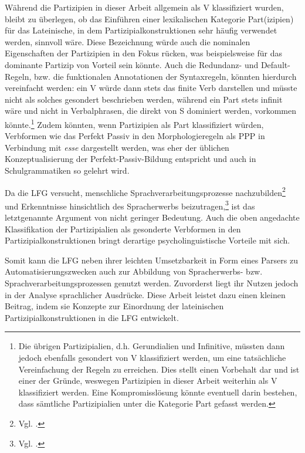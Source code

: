 \documentclass[12pt,a4paper]{article}
\begin{document}
Während die Partizipien in dieser Arbeit allgemein als V klassifiziert wurden, bleibt zu überlegen, ob das Einführen einer lexikalischen Kategorie Part(izipien) für das Lateinische, in dem Partizipialkonstruktionen sehr häufig verwendet werden, sinnvoll wäre. Diese Bezeichnung würde auch die nominalen Eigenschaften der Partizipien in den Fokus rücken, was beispielsweise für das dominante Partizip von Vorteil sein könnte.
Auch die Redundanz- und Default-Regeln, bzw. die funktionalen Annotationen der Syntaxregeln, könnten hierdurch vereinfacht werden: ein V würde dann stets das finite Verb darstellen und müsste nicht als solches gesondert beschrieben werden, während ein Part stets infinit wäre und nicht in Verbalphrasen, die direkt von S dominiert werden, vorkommen könnte.\footnote{Die übrigen Partizipialien, d.h. Gerundialien und Infinitive, müssten dann jedoch ebenfalls gesondert von V klassifiziert werden, um eine tatsächliche Vereinfachung der Regeln zu erreichen. Dies stellt einen Vorbehalt dar und ist einer der Gründe, weswegen Partizipien in dieser Arbeit weiterhin als V klassifiziert werden. Eine Kompromisslösung könnte eventuell darin bestehen, dass sämtliche Partizipialien unter die Kategorie Part gefasst werden.} Zudem könnten, wenn Partizipien als Part klassifiziert würden, Verbformen wie das Perfekt Passiv in den Morphologieregeln als PPP in Verbindung mit \textit{esse} dargestellt werden, was eher der üblichen Konzeptualisierung der Perfekt-Passiv-Bildung entspricht und auch in Schulgrammatiken so gelehrt wird. 

Da die LFG versucht, menschliche Sprachverarbeitungsprozesse nachzubilden\footnote{Vgl. \cite[12; 60]{Rohrer}.} und Erkenntnisse hinsichtlich des Spracherwerbs beizutragen,\footnote{Vgl. \cite[21]{DAZ}.} ist das letztgenannte Argument von nicht geringer Bedeutung. Auch die oben angedachte Klassifikation der Partizipialien als gesonderte Verbformen in den Partizipialkonstruktionen bringt derartige psycholinguistische Vorteile mit sich.

Somit kann die LFG neben ihrer leichten Umsetzbarkeit in Form eines Parsers zu Automatisierungszwecken auch zur Abbildung von Spracherwerbs- bzw. Sprachverarbeitungsprozessen genutzt werden. Zuvorderst liegt ihr Nutzen jedoch in der Analyse sprachlicher Ausdrücke. Diese Arbeit leistet dazu einen kleinen Beitrag, indem sie Konzepte zur Einordnung der lateinischen Partizipialkonstruktionen in die LFG entwickelt.

%
\pagebreak
\printbibliography
\end{document}
